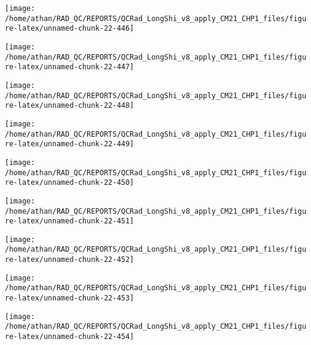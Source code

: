 \documentclass[
  10pt,
  a4paper,oneside]{article}
\begin{document}
\begin{center}\texttt{[image: /home/athan/RAD\_QC/REPORTS/QCRad\_LongShi\_v8\_apply\_CM21\_CHP1\_files/figure-latex/unnamed-chunk-22-446]} \end{center}

\begin{center}\texttt{[image: /home/athan/RAD\_QC/REPORTS/QCRad\_LongShi\_v8\_apply\_CM21\_CHP1\_files/figure-latex/unnamed-chunk-22-447]} \end{center}

\begin{center}\texttt{[image: /home/athan/RAD\_QC/REPORTS/QCRad\_LongShi\_v8\_apply\_CM21\_CHP1\_files/figure-latex/unnamed-chunk-22-448]} \end{center}

\begin{center}\texttt{[image: /home/athan/RAD\_QC/REPORTS/QCRad\_LongShi\_v8\_apply\_CM21\_CHP1\_files/figure-latex/unnamed-chunk-22-449]} \end{center}

\begin{center}\texttt{[image: /home/athan/RAD\_QC/REPORTS/QCRad\_LongShi\_v8\_apply\_CM21\_CHP1\_files/figure-latex/unnamed-chunk-22-450]} \end{center}

\begin{center}\texttt{[image: /home/athan/RAD\_QC/REPORTS/QCRad\_LongShi\_v8\_apply\_CM21\_CHP1\_files/figure-latex/unnamed-chunk-22-451]} \end{center}

\begin{center}\texttt{[image: /home/athan/RAD\_QC/REPORTS/QCRad\_LongShi\_v8\_apply\_CM21\_CHP1\_files/figure-latex/unnamed-chunk-22-452]} \end{center}

\begin{center}\texttt{[image: /home/athan/RAD\_QC/REPORTS/QCRad\_LongShi\_v8\_apply\_CM21\_CHP1\_files/figure-latex/unnamed-chunk-22-453]} \end{center}

\begin{center}\texttt{[image: /home/athan/RAD\_QC/REPORTS/QCRad\_LongShi\_v8\_apply\_CM21\_CHP1\_files/figure-latex/unnamed-chunk-22-454]} \end{center}
\end{document}
